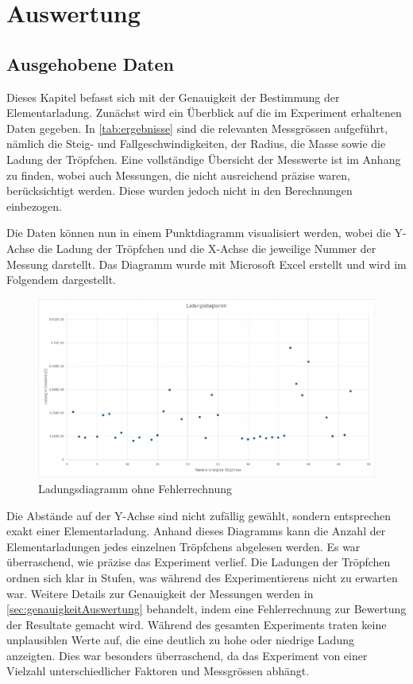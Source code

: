 \chapter{Auswertung}\label{cha:auswertung}
\section{Ausgehobene Daten}\label{sec:aushebungDaten}
Dieses Kapitel befasst sich mit der Genauigkeit der Bestimmung der Elementarladung. Zunächst wird ein Überblick auf die im Experiment erhaltenen Daten gegeben. In \autoref{tab:ergebnisse} sind die relevanten Messgrössen aufgeführt, nämlich die Steig- und Fallgeschwindigkeiten, der Radius, die Masse sowie die Ladung der Tröpfchen. Eine vollständige Übersicht der Messwerte ist im Anhang zu finden, wobei auch Messungen, die nicht ausreichend präzise waren, berücksichtigt werden. Diese wurden jedoch nicht in den Berechnungen einbezogen.

Die Daten können nun in einem Punktdiagramm visualisiert werden, wobei die Y-Achse die Ladung der Tröpfchen und die X-Achse die jeweilige Nummer der Messung darstellt. Das Diagramm wurde mit Microsoft Excel erstellt und wird im Folgendem dargestellt.

\begin{figure}[h]
	\centering
	\includegraphics[width=\textwidth]{bilder/pdf/LadungsdiagrammOhne.pdf}
	\caption{Ladungsdiagramm ohne Fehlerrechnung}
	\label{fig:ladungsdiagrammOFehlerrechnung}
\end{figure}

\noindent Die Abstände auf der Y-Achse sind nicht zufällig gewählt, sondern entsprechen exakt einer Elementarladung. Anhand dieses Diagramms kann die Anzahl der Elementarladungen jedes einzelnen Tröpfchens abgelesen werden. Es war überraschend, wie präzise das Experiment verlief. Die Ladungen der Tröpfchen ordnen sich klar in Stufen, was während des Experimentierens nicht zu erwarten war. Weitere Details zur Genauigkeit der Messungen werden in \autoref{sec:genauigkeitAuswertung} behandelt, indem eine Fehlerrechnung zur Bewertung der Resultate gemacht wird. Während des gesamten Experiments traten keine unplausiblen Werte auf, die eine deutlich zu hohe oder niedrige Ladung anzeigten. Dies war besonders überraschend, da das Experiment von einer Vielzahl unterschiedlicher Faktoren und Messgrössen abhängt.

